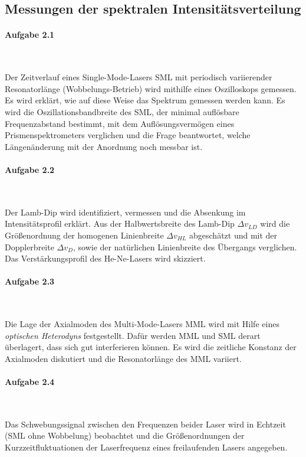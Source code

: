 \documentclass[a4paper,twoside,final]{article}
\begin{document}
\subsection{Messungen der spektralen Intensitätsverteilung}

\paragraph{Aufgabe 2.1}$~$

Der Zeitverlauf eines Single-Mode-Lasers SML mit periodisch variierender Resonatorlänge (Wobbelungs-Betrieb) wird mithilfe eines Oszilloskops gemessen. Es wird erklärt, wie auf diese Weise das Spektrum gemessen werden kann. Es wird die Oszillationsbandbreite des SML, der minimal auflösbare Frequenzabstand bestimmt, mit dem Auflösungsvermögen eines Prismenspektrometers verglichen und die Frage beantwortet, welche Längenänderung mit der Anordnung noch messbar ist.

\paragraph{Aufgabe 2.2}$~$

Der Lamb-Dip wird identifiziert, vermessen und die Absenkung im Intensitätsprofil erklärt. Aus der Halbwertsbreite des Lamb-Dip $\Delta v_{LD}$ wird die Größenordnung der homogenen Linienbreite $\Delta v_{HL}$ abgeschätzt und mit der Dopplerbreite $\Delta v_{D}$, sowie der natürlichen Linienbreite des Übergangs verglichen. Das Verstärkungsprofil des He-Ne-Lasers wird skizziert.

\paragraph{Aufgabe 2.3}$~$

Die Lage der Axialmoden des Multi-Mode-Lasers MML wird mit Hilfe eines \emph{optischen Heterodyns} festgestellt. Dafür werden MML und SML derart überlagert, dass sich gut interferieren können. Es wird die zeitliche Konstanz der Axialmoden diskutiert und die Resonatorlänge des MML variiert.

\paragraph{Aufgabe 2.4}$~$

Das Schwebungssignal zwischen den Frequenzen beider Laser wird in Echtzeit (SML ohne Wobbelung) beobachtet und die Größenordnungen der Kurzzeitfluktuationen der Laserfrequenz eines freilaufenden Lasers angegeben.
\end{document}
